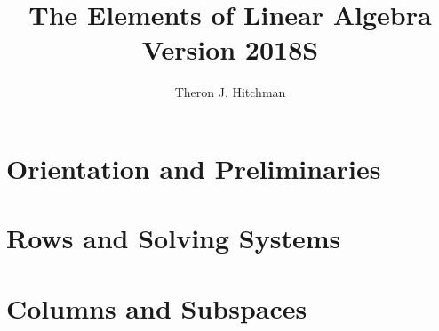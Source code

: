 \documentclass[11pt]{book}
\title{The Elements of Linear Algebra\\ Version 2018S}
\author{Theron J. Hitchman}
\theoremstyle{plain}
\theoremstyle{definition}
\begin{document}
\maketitle


\chapter{Orientation and Preliminaries}






\chapter{Rows and Solving Systems}









\chapter{Columns and Subspaces}












\end{document}
